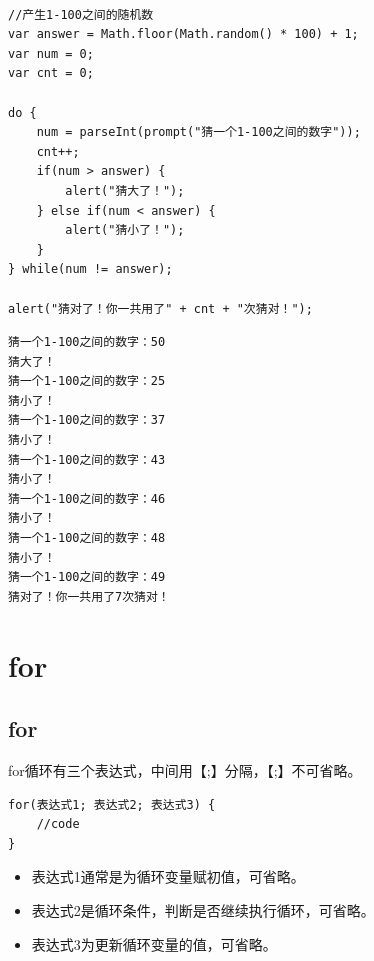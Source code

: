 \\

\begin{lstlisting}[style=htmlcssjs]
//产生1-100之间的随机数
var answer = Math.floor(Math.random() * 100) + 1;
var num = 0;
var cnt = 0;

do {
    num = parseInt(prompt("猜一个1-100之间的数字"));
    cnt++;
    if(num > answer) {
        alert("猜大了！");
    } else if(num < answer) {
        alert("猜小了！");
    }
} while(num != answer);

alert("猜对了！你一共用了" + cnt + "次猜对！");
\end{lstlisting}

\begin{tcolorbox}
	\begin{verbatim}
猜一个1-100之间的数字：50
猜大了！
猜一个1-100之间的数字：25
猜小了！
猜一个1-100之间的数字：37
猜小了！
猜一个1-100之间的数字：43
猜小了！
猜一个1-100之间的数字：46
猜小了！
猜一个1-100之间的数字：48
猜小了！
猜一个1-100之间的数字：49
猜对了！你一共用了7次猜对！
	\end{verbatim}
\end{tcolorbox}

\newpage

\section{for}

\subsection{for}

for循环有三个表达式，中间用【;】分隔，【;】不可省略。\\

\begin{lstlisting}[style=htmlcssjs]
for(表达式1; 表达式2; 表达式3) {
    //code
}
\end{lstlisting}

\begin{itemize}
	\item 表达式1通常是为循环变量赋初值，可省略。
	\item 表达式2是循环条件，判断是否继续执行循环，可省略。
	\item 表达式3为更新循环变量的值，可省略。
\end{itemize}

\\

